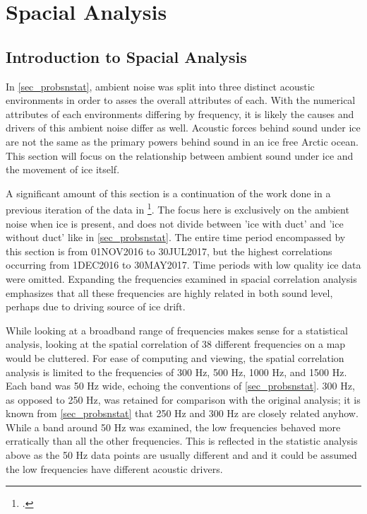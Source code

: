 
\chapter{Spacial Analysis} \label{chap_spacial}

\section{Introduction to Spacial Analysis} \label{sec_intro_spac}

In \autoref{sec_probsnstat}, ambient noise was split into three distinct acoustic environments in order to asses the overall attributes of each. With the numerical attributes of each environments differing by frequency, it is likely the causes and drivers of this ambient noise differ as well. Acoustic forces behind sound under ice are not the same as the primary powers behind sound in an ice free Arctic ocean. This section will focus on the relationship between ambient sound under ice and the movement of ice itself.

A significant amount of this section is a continuation of the work done in a previous iteration of the data in \footcite[]{BonnelMain}. The focus here is exclusively on the ambient noise when ice is present, and does not divide between 'ice with duct' and 'ice without duct' like in \autoref{sec_probsnstat}. The entire time period encompassed by this section is from 01NOV2016 to 30JUL2017, but the highest correlations occurring from 1DEC2016 to 30MAY2017. Time periods with low quality ice data were omitted. Expanding the frequencies examined in spacial correlation analysis emphasizes that all these frequencies are highly related in both sound level, perhaps due to driving source of ice drift. 

While looking at a broadband range of frequencies makes sense for a statistical analysis, looking at the spatial correlation of 38 different frequencies on a map would be cluttered. For ease of computing and viewing, the spatial correlation analysis is limited to the frequencies of 300 Hz, 500 Hz, 1000 Hz, and 1500 Hz. Each band was 50 Hz wide, echoing the conventions of \autoref{sec_probsnstat}. 300 Hz, as opposed to 250 Hz, was retained for comparison with the original analysis; it is known from \autoref{sec_probsnstat} that 250 Hz and 300 Hz are closely related anyhow. While a band around 50 Hz was examined, the low frequencies behaved more erratically than all the other frequencies. This is reflected in the statistic analysis above as the 50 Hz data points are usually different and and it could be assumed the low frequencies have different acoustic drivers. 

